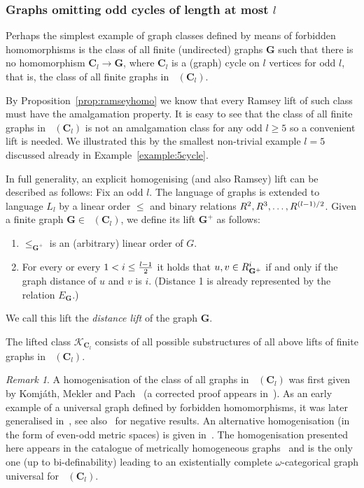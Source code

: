 \documentclass{elsarticle}
\def\Forb{\mathop{\mathrm{Forb_{he}}}\nolimits}
\def\str#1{\mathbf {#1}}
\def\nbrel#1#2{R\ifstrempty{#1}{}{_{#1}}\ifstrempty{#2}{}{^{#2}}}
\def\rel#1#2{\nbrel{\ifstrempty{#1}{}{\str{#1}}}{#2}}
\def\K{{\mathcal K}}
\theoremstyle{plain}
\theoremstyle{definition}
\theoremstyle{remark}
\newtheorem*{remark}{Remark}
\begin{document}
\subsubsection{Graphs omitting odd cycles of length at most $l$}
\label{sec:cycles}
Perhaps the simplest example of graph classes defined by means of forbidden homomorphisms is the class of all finite (undirected) graphs $\str{G}$ such that there is no homomorphism $\str{C}_l\to \str{G}$, where $\str{C}_l$ is a (graph) cycle on $l$ vertices for odd $l$, that is, the class of all finite graphs in $\Forb(\str{C}_l)$.

By Proposition~\ref{prop:ramseyhomo} we know that every Ramsey lift of such class must have
the amalgamation property. It is easy to see that the class of all finite graphs in $\Forb(\str{C}_l)$ is not
an amalgamation class for any odd $l\geq 5$ so a convenient lift is needed. We illustrated this by 
the smallest non-trivial example $l=5$ discussed already in Example~\ref{example:5cycle}. 

In full generality, an explicit homogenising (and also Ramsey) lift can be described as follows:
Fix an odd $l$. The language of graphs is extended to language $L_l$ by a linear order $\leq$
 and binary relations $\rel{}{2}, \rel{}{3}, \ldots, \rel{}{(l-1)/2}$.  
Given a finite graph $\str{G}\in \Forb(\str{C}_l)$, we define its lift $\str{G}^+$ as follows:
\begin{enumerate}
\item $\leq_{\str{G}^+}$ is an (arbitrary) linear order of $G$.
\item For every or every $1 < i\leq {l-1\over 2}$ it holds that ${u,v}\in \nbrel{\str{G}^+}{i}$ if and only if the graph distance of $u$ and $v$ is $i$. (Distance 1 is already represented by the relation $E_\str{G}$.)
\end{enumerate}
We call this lift the \emph{distance lift} of the graph $\str{G}$.

The lifted class $\K_{\str C_l}$ consists of all possible substructures of all above lifts of finite graphs in $\Forb(\str{C}_l)$.

\begin{remark}
A homogenisation of the class of all graphs in $\Forb(\str{C}_l)$ was first given by
Komj{\'a}th, Mekler and Pach~\cite{Komjath1988} (a corrected proof appears in~\cite{Komjath1999}).
As an early example of a universal graph defined by forbidden homomorphisms, it was later generalised in~\cite{Cherlin1999}, see also~\cite{Cherlin1994, Cherlin1996} for negative results. An alternative homogenisation (in the form of even-odd metric spaces) is given in~\cite{Hubicka2009}. The homogenisation presented here appears in the catalogue of metrically homogeneous
graphs~\cite{Cherlin2013} and is the only one (up to bi-definability) leading to an existentially complete
$\omega$-categorical graph universal for $\Forb(\str{C}_l)$.
\end{remark}
\end{document}
